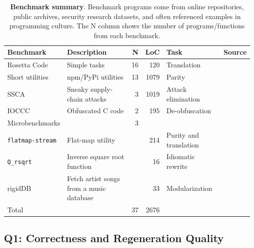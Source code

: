 \documentclass[nonacm,sigplan,review]{acmart}
\newcommand{\ttt}[1]{\texttt{#1}\xspace}
\begin{document}
\begin{table}[htpb]
\centering
  \caption{\textbf{Benchmark summary}. 
  Benchmark programs come from online repositories, public archives, security research datasets, and often referenced examples in programming culture.
The N column shows the number of programs/functions from each benchmark.
}
  \begin{tabular*}{\textwidth}{llrrll}
\toprule
Benchmark                          & Description                              & N  & LoC & Task                   & Source \\
\midrule
Rosetta Code                       & Simple tasks                             & 16 & 120 & Translation            & \cite{rosettacode} \\
Short utilities                    & npm/PyPi utilities                       & 13 & 1079& Parity                 & \cite{regbench2025} \\
SSCA                               & Sneaky supply-chain attacks              & 3  & 1019& Attack elimination     & \cite{ev:eurosec:2022, ohm2020backstabber,copeland2019frightening} \\
IOCCC                              & Obfuscated C code                        & 2  & 195 & De-obfuscation         & \cite{ioccc} \\
Microbenchmarks                    &                                          & 3  &     &                        & \\
\hspace{.5em} \ttt{flatmap-stream} & Flat-map utility                         &    & 214 & Purity and translation & \cite{es1}  \\
\hspace{.5em} \ttt{Q\_rsqrt}       & Inverse square root function             &    & 16  & Idiomatic rewrite      & \cite{fast_inv_sqrt}  \\
\hspace{.5em} \textsf{rigidDB}     & Fetch artist songs from a music database &    & 33  & Modularization         & \cite{codewithsadeemusicplayer} \\
\midrule
Total                              &                                          & 37 & 2676&                        & \\
\bottomrule
\end{tabular*}
\label{tab:benchmarks}
\end{table}

\subsection{Q1: Correctness and Regeneration Quality}
\end{document}

